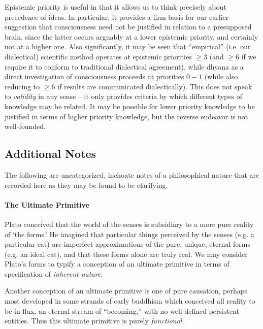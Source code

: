\documentclass[pra,twocolumn,groupedaddress,10pt]{revtex4}
\theoremstyle{definition}
\begin{document}
Epistemic priority is useful in that it allows us to think precisely about precedence of ideas. In particular, it provides a firm basis for our earlier suggestion that consciousness need not be justified in relation to a presupposed brain, since the latter occurs arguably at a lower epistemic priority, and certainly not at a higher one. Also significantly, it may be seen that ``empirical'' (i.e. our dialectical) scientific method operates at epistemic priorities $\geq 3$ (and $\geq 6$ if we require it to conform to traditional dialectical agreement), while dhyana as a direct investigation of consciousness proceeds at priorities $0 - 1$ (while also reducing to $\geq 6$ if results are communicated dialectically). This does not speak to \emph{validity} in any sense -- it only provides criteria by which different types of knowledge may be related. It may be possible for lower priority knowledge to be justified in terms of higher priority knowledge, but the reverse endeavor is not well-founded.

\subsection{Additional Notes}

The following are uncategorized, inchoate notes of a philosophical nature that are recorded here as they may be found to be clarifying.

\paragraph{The Ultimate Primitive} \label{sec:ultpri} Plato conceived that the world of the senses is subsidiary to a more pure reality of `the forms.' He imagined that particular things perceived by the senses (e.g. a particular cat) are imperfect approximations of the pure, unique, eternal forms (e.g. an ideal cat), and that these forms alone are truly real. We may consider Plato's forms to typify a conception of an ultimate primitive in terms of specification of \emph{inherent nature}.

Another conception of an ultimate primitive is one of pure causation, perhaps most developed in some strands of early buddhism which conceived all reality to be in flux, an eternal stream of ``becoming,'' with no well-defined persistent entities. Thus this ultimate primitive is purely \emph{functional}.
\end{document}
